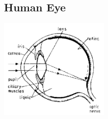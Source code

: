 \begin{multicols}{2}
\vfill
\columnbreak

%
%

\subsection{Human Eye}

\begin{center}
\includegraphics[width=0.4\textwidth]{./img/source/human-eye.png}
\end{center}


\end{multicols}
